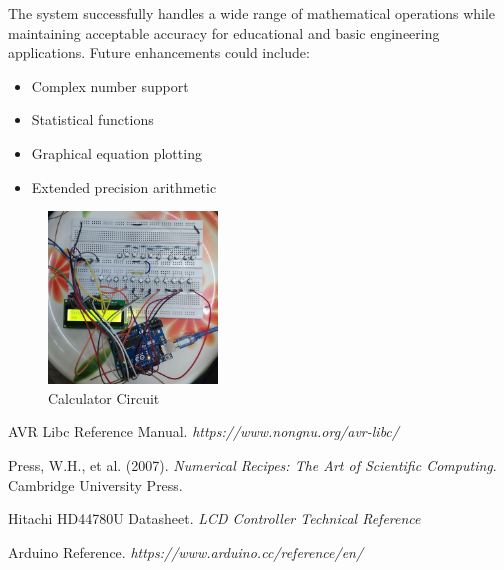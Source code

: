 \documentclass{article}
\begin{document}
The system successfully handles a wide range of mathematical operations while maintaining acceptable accuracy for educational and basic engineering applications. Future enhancements could include:

\begin{itemize}
\item Complex number support
\item Statistical functions
\item Graphical equation plotting
\item Extended precision arithmetic
\end{itemize}

\begin{figure}[h]
    \centering
    \includegraphics[width=0.4\textwidth]{calculator.jpeg}   
    \caption{Calculator Circuit}
\end{figure}

\begin{thebibliography}{9}
AVR Libc Reference Manual.
\textit{https://www.nongnu.org/avr-libc/}

Press, W.H., et al. (2007). 
\textit{Numerical Recipes: The Art of Scientific Computing}. 
Cambridge University Press.

Hitachi HD44780U Datasheet.
\textit{LCD Controller Technical Reference}

Arduino Reference.
\textit{https://www.arduino.cc/reference/en/}
\end{thebibliography}
\end{document}

